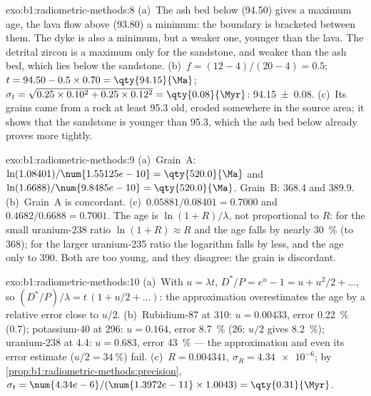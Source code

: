 \begin{solution}{exo:b1:radiometric-methods:8}
(a)~The ash bed below (\qty{94.50}{\Ma}) gives a maximum age, the lava flow above
(\qty{93.80}{\Ma}) a minimum: the boundary is bracketed between them. The dyke is
also a minimum, but a weaker one, younger than the lava. The detrital zircon is a
maximum only for the sandstone, and weaker than the ash bed, which lies below the
sandstone. (b)~$f = (12 - 4)/(20 - 4) = 0.5$; $t = 94.50 - 0.5 \times 0.70 =
\qty{94.15}{\Ma}$; $\sigma_t = \sqrt{0.25 \times 0.10^2 + 0.25 \times 0.12^2} =
\qty{0.08}{\Myr}$: \qty[uncertainty-mode=separate]{94.15(8)}{\Ma}. (c)~Its
grains came from a rock at least \qty{95.3}{\Ma} old, eroded somewhere in the
source area; it shows that the sandstone is younger than \qty{95.3}{\Ma}, which
the ash bed below already proves more tightly.
\end{solution}

\begin{solution}{exo:b1:radiometric-methods:9}
(a)~Grain~A: $\ln(1.08401)/\num{1.55125e-10} = \qty{520.0}{\Ma}$ and
$\ln(1.6688)/\num{9.8485e-10} = \qty{520.0}{\Ma}$. Grain~B: \qty{368.4}{\Ma} and
\qty{389.9}{\Ma}. (b)~Grain~A is concordant. (c)~$0.05881/0.08401 = 0.7000$ and
$0.4682/0.6688 = 0.7001$. The age is $\ln(1 + R)/\lambda$, not proportional to
$R$: for the small uranium-238 ratio $\ln(1+R) \approx R$ and the age falls by
nearly \qty{30}{\percent} (to \qty{368}{\Ma}); for the larger uranium-235 ratio
the logarithm falls by less, and the age only to \qty{390}{\Ma}. Both are too
young, and they disagree: the grain is discordant.
\end{solution}

\begin{solution}{exo:b1:radiometric-methods:10}
(a)~With $u = \lambda t$, $D^*/P = e^u - 1 = u + u^2/2 + \dots$, so $(D^*/P)/\lambda
= t\,(1 + u/2 + \dots)$: the approximation overestimates the age by a relative
error close to $u/2$. (b)~Rubidium-87 at \qty{310}{\Ma}: $u = 0.00433$, error
\qty{0.22}{\percent} (\qty{0.7}{\Myr}); potassium-40 at \qty{296}{\Ma}: $u =
0.164$, error \qty{8.7}{\percent} (\qty{26}{\Myr}; $u/2$ gives \qty{8.2}{\percent});
uranium-238 at \qty{4.4}{\Ga}: $u = 0.683$, error \qty{43}{\percent} --- the
approximation and even its error estimate ($u/2 = \qty{34}{\percent}$) fail.
(c)~$R = 0.004341$, $\sigma_R = \num{4.34e-6}$; by
\cref{prop:b1:radiometric-methods:precision}, $\sigma_t =
\num{4.34e-6}/(\num{1.3972e-11} \times 1.0043) = \qty{0.31}{\Myr}$.
\end{solution}

